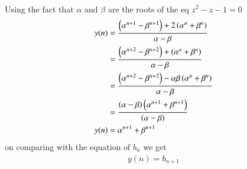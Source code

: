 \documentclass[journal,12pt,twocolumn]{IEEEtran}
\renewcommand\thesection{\arabic{section}}
\begin{document}
\begin{enumerate}[label=\thesection.\arabic*,ref=\thesection.\theenumi]
\begin{align}
\end{align}
Using the fact that $\alpha$ and $\beta$ are the roots of the eq $z^2-z-1 = 0$
\begin{align}
y(n) &= \frac{\left({\alpha}^{n+1} - {\beta}^{n+1}\right) + 2\left({\alpha}^{n} + {\beta}^n\right)}{\alpha - \beta}\\ &= \frac{\left({\alpha}^{n+2} - {\beta}^{n+2}\right) + \left({\alpha}^{n} + {\beta}^n\right)}{\alpha - \beta}\\ &= \frac{\left({\alpha}^{n+2} - {\beta}^{n+2}\right) -\alpha \beta \left({\alpha}^{n} + {\beta}^n\right)}{\alpha - \beta}\\ &= \frac{\left(\alpha - \beta\right)\left({\alpha}^{n+1} + {\beta}^{n+1}\right)}{\left(\alpha - \beta\right)}\\ y(n) &= {\alpha}^{n+1} + {\beta}^{n+1}
\end{align}
on comparing with the equation of $b_n$ we get
\begin{align*}
y(n) = b_{n+1}
\end{align*}
\end{enumerate}
\end{document}

